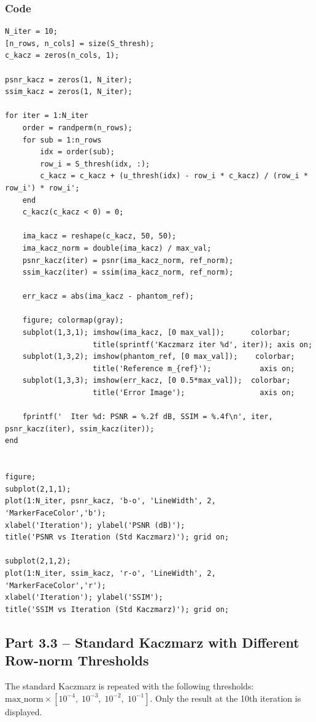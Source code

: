 \documentclass[12pt,a4paper]{article}
\begin{document}
\subsubsection*{Code}
\begin{lstlisting}
N_iter = 10;
[n_rows, n_cols] = size(S_thresh);
c_kacz = zeros(n_cols, 1);

psnr_kacz = zeros(1, N_iter);
ssim_kacz = zeros(1, N_iter);

for iter = 1:N_iter
    order = randperm(n_rows);
    for sub = 1:n_rows
        idx = order(sub);
        row_i = S_thresh(idx, :);
        c_kacz = c_kacz + (u_thresh(idx) - row_i * c_kacz) / (row_i * row_i') * row_i';
    end
    c_kacz(c_kacz < 0) = 0;

    ima_kacz = reshape(c_kacz, 50, 50);
    ima_kacz_norm = double(ima_kacz) / max_val;
    psnr_kacz(iter) = psnr(ima_kacz_norm, ref_norm);
    ssim_kacz(iter) = ssim(ima_kacz_norm, ref_norm);

    err_kacz = abs(ima_kacz - phantom_ref);

    figure; colormap(gray);
    subplot(1,3,1); imshow(ima_kacz, [0 max_val]);      colorbar;
                    title(sprintf('Kaczmarz iter %d', iter)); axis on;
    subplot(1,3,2); imshow(phantom_ref, [0 max_val]);    colorbar;
                    title('Reference m_{ref}');           axis on;
    subplot(1,3,3); imshow(err_kacz, [0 0.5*max_val]);  colorbar;
                    title('Error Image');                 axis on;

    fprintf('  Iter %d: PSNR = %.2f dB, SSIM = %.4f\n', iter, psnr_kacz(iter), ssim_kacz(iter));
end


figure;
subplot(2,1,1);
plot(1:N_iter, psnr_kacz, 'b-o', 'LineWidth', 2, 'MarkerFaceColor','b');
xlabel('Iteration'); ylabel('PSNR (dB)');
title('PSNR vs Iteration (Std Kaczmarz)'); grid on;

subplot(2,1,2);
plot(1:N_iter, ssim_kacz, 'r-o', 'LineWidth', 2, 'MarkerFaceColor','r');
xlabel('Iteration'); ylabel('SSIM');
title('SSIM vs Iteration (Std Kaczmarz)'); grid on;
\end{lstlisting}

\subsection{Part 3.3 -- Standard Kaczmarz with Different Row-norm Thresholds}

The standard Kaczmarz is repeated with the following thresholds: $\mathrm{max\_norm} \times [10^{-4},\; 10^{-3},\; 10^{-2},\; 10^{-1}]$. Only the result at the 10th iteration is displayed.
\end{document}

